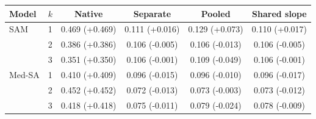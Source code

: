 \begin{tabular}{llcccc}
\toprule
Model & $k$ & Native & Separate & Pooled & Shared slope \\
\midrule
SAM & 1 & 0.469 (+0.469) & 0.111 (+0.016) & 0.129 (+0.073) & 0.110 (+0.017) \\
 & 2 & 0.386 (+0.386) & 0.106 (-0.005) & 0.106 (-0.013) & 0.106 (-0.005) \\
 & 3 & 0.351 (+0.350) & 0.106 (-0.001) & 0.109 (-0.049) & 0.106 (-0.001) \\
\midrule
Med-SA & 1 & 0.410 (+0.409) & 0.096 (-0.015) & 0.096 (-0.010) & 0.096 (-0.017) \\
 & 2 & 0.452 (+0.452) & 0.072 (-0.013) & 0.073 (-0.003) & 0.073 (-0.012) \\
 & 3 & 0.418 (+0.418) & 0.075 (-0.011) & 0.079 (-0.024) & 0.078 (-0.009) \\
\bottomrule
\end{tabular}
